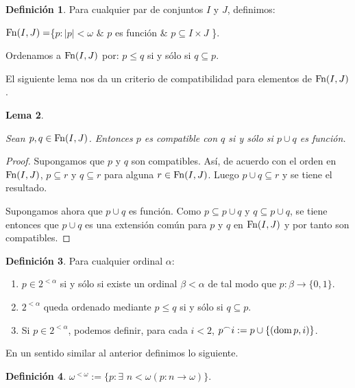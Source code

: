 \documentclass[11pt]{unam_tesis1}
\theoremstyle{MyThmStyle}
\theoremstyle{definition}
\newtheorem{definition}{Definici\'on}[chapter]
\theoremstyle{plain}
\newtheorem{lemma}[definition]{Lema}
\theoremstyle{remark}
\def\dom{\mathop{\rm dom}\nolimits}
\let\leq\leqslant
\begin{document}
\begin{definition}

Para cualquier par de conjuntos $I$ y $J$, definimos:

\begin{center}
${\rm Fn}(I,J)=$\{$p:|p|<\omega$ $\&$ $p$ es funci\'on $\&$ $p \subseteq I \times J$ \}.
\end{center}

Ordenamos a ${\rm Fn}(I,J)$ por: $p\leq q$ si y s\'olo si $q\subseteq p$.

\end{definition}

El siguiente lema nos da un criterio de compatibilidad para elementos de ${\rm Fn}(I,J)$.

\begin{lemma}\label{unionesfuncion}

Sean $p,q\in {\rm Fn}(I,J)$. Entonces $p$ es compatible con $q$ si y s\'olo si $p\cup q$ es funci\'on.

\end{lemma}

\begin{proof}
Supongamos que $p$ y $q$ son compatibles. As\'i, de acuerdo con el orden en ${\rm Fn}(I,J)$, $p\subseteq r$ y $q\subseteq r$ para alguna $r\in {\rm Fn}(I,J)$. Luego $p\cup q\subseteq r$ y se tiene el resultado.

Supongamos ahora que $p\cup q$ es funci\'on. Como $p\subseteq p\cup q$ y $q\subseteq p\cup q$, se tiene entonces que $p\cup q$ es una extensi\'on com\'un para $p$ y $q$ en ${\rm Fn}(I,J)$ y por tanto son compatibles.
\end{proof}

\begin{definition}\label{concatenacion}
Para cualquier ordinal $\alpha$: 
\begin{enumerate}
\item $p \in 2^{<\alpha}$ si y s\'olo si existe un ordinal $\beta < \alpha$ de tal modo que $p:\beta \to \{0,1\}$.

\item $2^{<\alpha}$ queda ordenado mediante $p \leq q$ si y s\'olo si $q \subseteq p$.

\item Si $p \in 2^{<\alpha}$, podemos definir, para cada $i<2$,  $p^\frown i := p \cup \{(\dom p,i)\}$.
\end{enumerate}
\end{definition}

En un sentido similar al anterior definimos lo siguiente.
\begin{definition}
$\omega^{<\omega}:=\{p:\exists$ $n<\omega (p:n\to \omega) \}$.
\end{definition}
\end{document}
